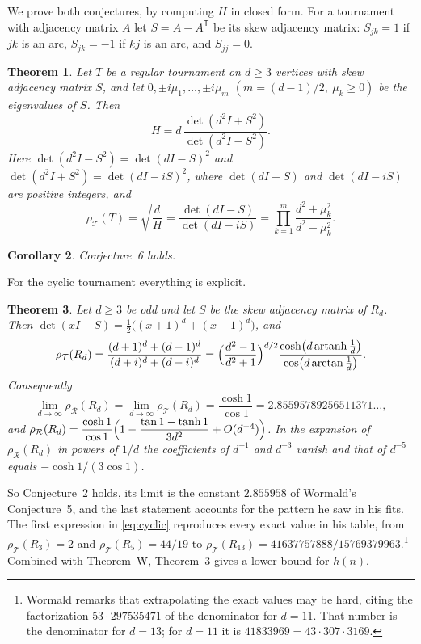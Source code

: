 \documentclass[11pt]{amsart}
\newtheorem{theorem}{Theorem}[section]
\newtheorem{corollary}[theorem]{Corollary}
\theoremstyle{remark}
\numberwithin{equation}{section}
\newcommand{\T}{\mathsf{T}}
\newcommand{\artanh}{\operatorname{artanh}}
\newcommand{\cT}{\mathcal{T}}
\newcommand{\cR}{\mathcal{R}}
\begin{document}
We prove both conjectures, by computing $H$ in closed form. For a tournament with adjacency matrix $A$ let $S=A-A^\T$ be its skew adjacency matrix: $S_{jk}=1$ if $jk$ is an arc, $S_{jk}=-1$ if $kj$ is an arc, and $S_{jj}=0$.

\begin{theorem}\label{thm:main}
Let $T$ be a regular tournament on $d\ge3$ vertices with skew adjacency matrix $S$, and let $0,\pm i\mu_1,\dots,\pm i\mu_m$ $(m=(d-1)/2,\ \mu_k\ge0)$ be the eigenvalues of $S$. Then
\begin{equation}\label{eq:main}
H=d\,\frac{\det(d^2I+S^2)}{\det(d^2I-S^2)}.
\end{equation}
Here $\det(d^2I-S^2)=\det(dI-S)^2$ and $\det(d^2I+S^2)=\det(dI-iS)^2$, where $\det(dI-S)$ and $\det(dI-iS)$ are positive integers, and
\begin{equation}\label{eq:rho}
\rho_\cT(T)=\sqrt{\frac dH}=\frac{\det(dI-S)}{\det(dI-iS)}=\prod_{k=1}^m\frac{d^2+\mu_k^2}{d^2-\mu_k^2}.
\end{equation}
\end{theorem}

\begin{corollary}\label{cor:conj6}
Conjecture~6 holds.
\end{corollary}

For the cyclic tournament everything is explicit.

\begin{theorem}\label{thm:cyclic}
Let $d\ge3$ be odd and let $S$ be the skew adjacency matrix of $R_d$. Then $\det(xI-S)=\tfrac12\bigl((x+1)^d+(x-1)^d\bigr)$, and
\begin{equation}\label{eq:cyclic}
\rho_\cT(R_d)=\frac{(d+1)^d+(d-1)^d}{(d+i)^d+(d-i)^d}
=\Bigl(\frac{d^2-1}{d^2+1}\Bigr)^{d/2}\frac{\cosh\bigl(d\artanh\frac1d\bigr)}{\cos\bigl(d\arctan\frac1d\bigr)}.
\end{equation}
Consequently
\[
\lim_{d\to\infty}\rho_\cR(R_d)=\lim_{d\to\infty}\rho_\cT(R_d)=\frac{\cosh 1}{\cos 1}=2.85595789256511371\ldots,
\]
and $\rho_\cR(R_d)=\dfrac{\cosh1}{\cos1}\Bigl(1-\dfrac{\tan1-\tanh1}{3d^2}+O(d^{-4})\Bigr)$. In the expansion of $\rho_\cR(R_d)$ in powers of $1/d$ the coefficients of $d^{-1}$ and $d^{-3}$ vanish and that of $d^{-5}$ equals $-\cosh1/(3\cos1)$.
\end{theorem}

So Conjecture~2 holds, its limit is the constant $2.855958$ of Wormald's Conjecture~5, and the last statement accounts for the pattern he saw in his fits. The first expression in \eqref{eq:cyclic} reproduces every exact value in his table, from $\rho_\cT(R_3)=2$ and $\rho_\cT(R_5)=44/19$ to $\rho_\cT(R_{13})=41637757888/15769379963$.\footnote{Wormald remarks that extrapolating the exact values may be hard, citing the factorization $53\cdot297535471$ of the denominator for $d=11$. That number is the denominator for $d=13$; for $d=11$ it is $41833969=43\cdot307\cdot3169$.} Combined with Theorem~W, Theorem~\ref{thm:cyclic} gives a lower bound for $h(n)$.
\end{document}

